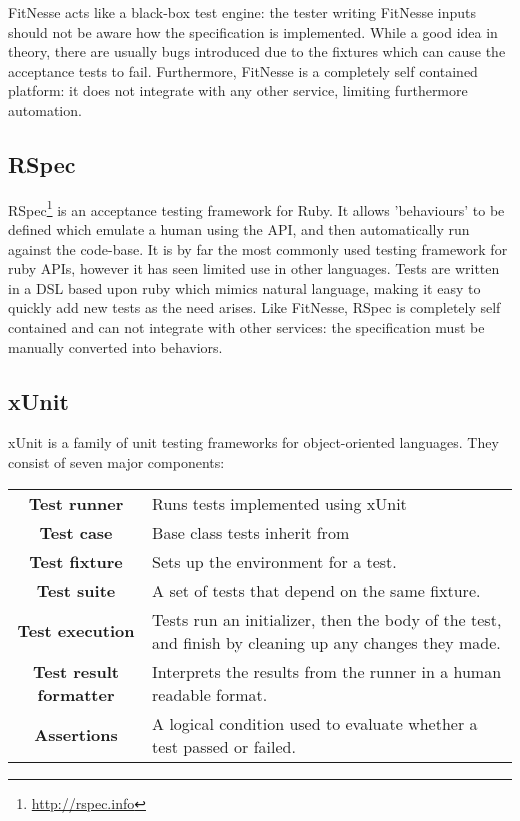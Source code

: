 FitNesse acts like a black-box test engine: the tester writing FitNesse inputs should not be aware how the specification is implemented. While a good idea in theory, there are usually bugs introduced due to the fixtures which can cause the acceptance tests to fail.  Furthermore, FitNesse is a completely self contained platform: it does not integrate with any other service, limiting furthermore automation.

\subsection{RSpec}

RSpec\footnote{\url{http://rspec.info}} is an acceptance testing framework for Ruby. It allows 'behaviours' to be defined which emulate a human using the API, and then automatically run against the code-base. It is by far the most commonly used testing framework for ruby APIs, however it has seen limited use in other languages. Tests are written in a DSL based upon ruby which mimics natural language, making it easy to quickly add new tests as the need arises. Like FitNesse, RSpec is completely self contained and can not integrate with other services: the specification must be manually converted into behaviors.

\subsection{xUnit}

xUnit is a family of unit testing frameworks for object-oriented languages. They consist of seven major components:

\begin{tabular}{c  p{10cm}}
\textbf{Test runner} & Runs tests implemented using xUnit \\
\textbf{Test case} & Base class tests inherit from \\
\textbf{Test fixture} & Sets up the environment for a test. \\
\textbf{Test suite} & A set of tests that depend on the same fixture. \\
\textbf{Test execution} & Tests run an initializer, then the body of the test, and finish by cleaning up any changes they made. \\
\textbf{Test result formatter} & Interprets the results from the runner in a human readable format. \\
\textbf{Assertions} & A logical condition used to evaluate whether a test passed or failed. \\
\end{tabular}


